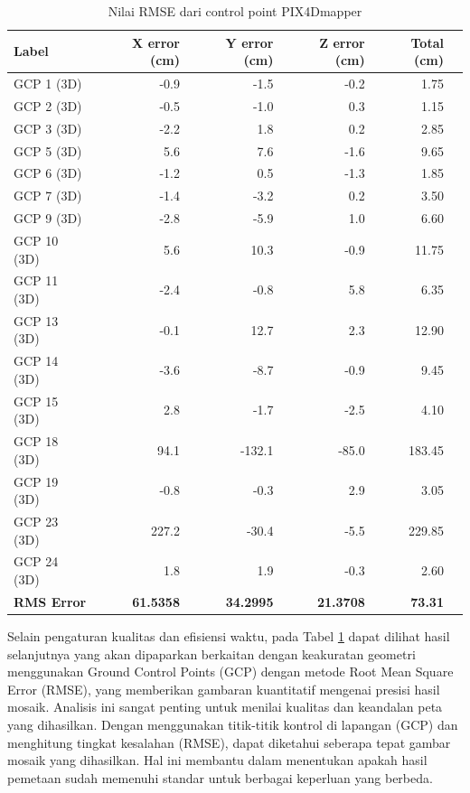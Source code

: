 \begin{table}[H]
\centering
\renewcommand{\arraystretch}{1}
\caption{Nilai RMSE dari control point PIX4Dmapper}
\begin{tabular}{|l|r|r|r|r|r|}
\hline
\textbf{Label} &\textbf{ X error (cm)} &\textbf{ Y error (cm)} & \textbf{Z error (cm)} & \textbf{Total (cm)} \\
\hline
GCP 1 (3D) & -0.9 & -1.5 & -0.2 & 1.75 \\
\hline
GCP 2 (3D) & -0.5 & -1.0 & 0.3 & 1.15 \\
\hline
GCP 3 (3D) & -2.2 & 1.8 & 0.2 & 2.85 \\
\hline
GCP 5 (3D) & 5.6 & 7.6 & -1.6 & 9.65 \\
\hline
GCP 6 (3D) & -1.2 & 0.5 & -1.3 & 1.85 \\
\hline
GCP 7 (3D) & -1.4 & -3.2 & 0.2 & 3.50 \\
\hline
GCP 9 (3D) & -2.8 & -5.9 & 1.0 & 6.60 \\
\hline
GCP 10 (3D) & 5.6 & 10.3 & -0.9 & 11.75 \\
\hline
GCP 11 (3D) & -2.4 & -0.8 & 5.8 & 6.35 \\
\hline
GCP 13 (3D) & -0.1 & 12.7 & 2.3 & 12.90 \\
\hline
GCP 14 (3D) & -3.6 & -8.7 & -0.9 & 9.45 \\
\hline
GCP 15 (3D) & 2.8 & -1.7 & -2.5 & 4.10 \\
\hline
GCP 18 (3D) & 94.1 & -132.1 & -85.0 & 183.45 \\
\hline
GCP 19 (3D) & -0.8 & -0.3 & 2.9 & 3.05 \\
\hline
GCP 23 (3D) & 227.2 & -30.4 & -5.5 & 229.85 \\
\hline
GCP 24 (3D) & 1.8 & 1.9 & -0.3 & 2.60 \\
\hline
\textbf{RMS Error} & \textbf{61.5358} & \textbf{34.2995} & \textbf{21.3708} & \textbf{73.31} \\
\hline
\end{tabular}
\label{tab:gcp_error_cm}
\end{table}

Selain pengaturan kualitas dan efisiensi waktu, pada Tabel \ref{tab:gcp_error_cm} dapat dilihat hasil selanjutnya yang akan dipaparkan berkaitan dengan keakuratan geometri menggunakan Ground Control Points (GCP) dengan metode Root Mean Square Error (RMSE), yang memberikan gambaran kuantitatif mengenai presisi hasil mosaik. Analisis ini sangat penting untuk menilai kualitas dan keandalan peta yang dihasilkan. Dengan menggunakan titik-titik kontrol di lapangan (GCP) dan menghitung tingkat kesalahan (RMSE), dapat diketahui seberapa tepat gambar mosaik yang dihasilkan. Hal ini membantu dalam menentukan apakah hasil pemetaan sudah memenuhi standar untuk berbagai keperluan yang berbeda.

